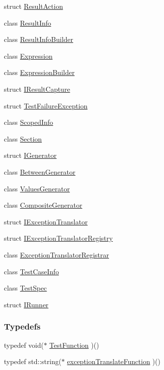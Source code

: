 \begin{DoxyCompactItemize}
\item 
struct \hyperlink{structCatch_1_1ResultAction}{Result\-Action}
\item 
class \hyperlink{classCatch_1_1ResultInfo}{Result\-Info}
\item 
class \hyperlink{classCatch_1_1ResultInfoBuilder}{Result\-Info\-Builder}
\item 
class \hyperlink{classCatch_1_1Expression}{Expression}
\item 
class \hyperlink{classCatch_1_1ExpressionBuilder}{Expression\-Builder}
\item 
struct \hyperlink{structCatch_1_1IResultCapture}{I\-Result\-Capture}
\item 
struct \hyperlink{structCatch_1_1TestFailureException}{Test\-Failure\-Exception}
\item 
class \hyperlink{classCatch_1_1ScopedInfo}{Scoped\-Info}
\item 
class \hyperlink{classCatch_1_1Section}{Section}
\item 
struct \hyperlink{structCatch_1_1IGenerator}{I\-Generator}
\item 
class \hyperlink{classCatch_1_1BetweenGenerator}{Between\-Generator}
\item 
class \hyperlink{classCatch_1_1ValuesGenerator}{Values\-Generator}
\item 
class \hyperlink{classCatch_1_1CompositeGenerator}{Composite\-Generator}
\item 
struct \hyperlink{structCatch_1_1IExceptionTranslator}{I\-Exception\-Translator}
\item 
struct \hyperlink{structCatch_1_1IExceptionTranslatorRegistry}{I\-Exception\-Translator\-Registry}
\item 
class \hyperlink{classCatch_1_1ExceptionTranslatorRegistrar}{Exception\-Translator\-Registrar}
\item 
class \hyperlink{classCatch_1_1TestCaseInfo}{Test\-Case\-Info}
\item 
class \hyperlink{classCatch_1_1TestSpec}{Test\-Spec}
\item 
struct \hyperlink{structCatch_1_1IRunner}{I\-Runner}
\end{DoxyCompactItemize}
\subsubsection*{Typedefs}
\begin{DoxyCompactItemize}
\item 
typedef void($\ast$ \hyperlink{namespaceCatch_a768da872b9033e4c71c6f316393d35db}{Test\-Function} )()
\item 
typedef std\-::string($\ast$ \hyperlink{namespaceCatch_ae1727c8cadfc5ad8b43dff651cd2f8b0}{exception\-Translate\-Function} )()
\end{DoxyCompactItemize}
